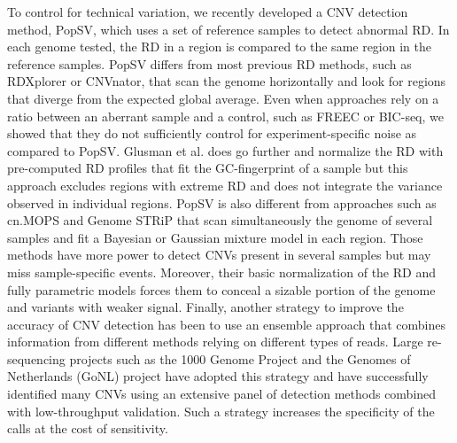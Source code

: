 To control for technical variation, we recently developed a CNV detection method, {\sf PopSV}, which uses a set of reference samples to detect abnormal RD\cite{Monlong2018}. 
In each genome tested, the RD in a region is compared to the same region in the reference samples.
{\sf PopSV} differs from most previous RD methods, such as {\sf RDXplorer}\cite{Yoon2009} or {\sf CNVnator}\cite{Abyzov2011}, that scan the genome horizontally and look for regions that diverge from the expected global average.
Even when approaches rely on a ratio between an aberrant sample and a control, such as {\sf FREEC}\cite{Boeva2011} or {\sf BIC-seq}\cite{Xi2011}, we showed that they do not sufficiently control for experiment-specific noise as compared to {\sf PopSV}\cite{Monlong2018}.
Glusman et al.\cite{Glusman2015} does go further and normalize the RD with pre-computed RD profiles that fit the GC-fingerprint of a sample but this approach excludes regions with extreme RD and does not integrate the variance observed in individual regions. %
{\sf PopSV} is also different from approaches such as {\sf cn.MOPS}\cite{Klambauer2012} and {\sf Genome STRiP}\cite{Handsaker2015} that scan simultaneously the genome of several samples and fit a Bayesian or Gaussian mixture model in each region.
Those methods have more power to detect CNVs present in several samples but may miss sample-specific events.
Moreover, their basic normalization of the RD and fully parametric models forces them to conceal a sizable portion of the genome and variants with weaker signal.
Finally, another strategy to improve the accuracy of CNV detection has been to use an ensemble approach that combines information from different methods relying on different types of reads.
Large re-sequencing projects such as the 1000 Genome Project\cite{Sudmant2015a,Mills2011} and the Genomes of Netherlands (GoNL) project \cite{Francioli2014,Kloosterman} have adopted this strategy and have successfully identified many CNVs using an extensive panel of detection methods combined with low-throughput validation.
Such a strategy increases the specificity of the calls at the cost of sensitivity.


